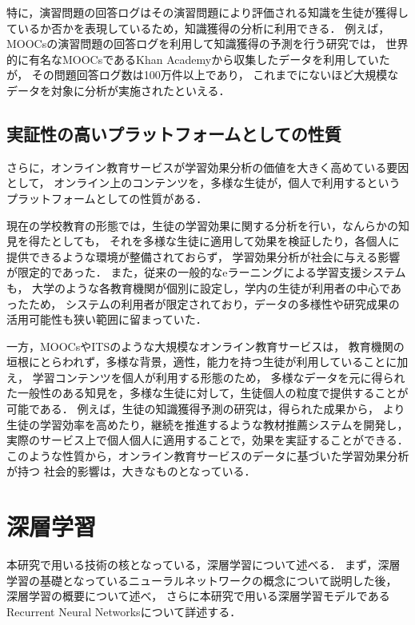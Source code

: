 特に，演習問題の回答ログはその演習問題により評価される知識を生徒が獲得しているか否かを表現しているため，知識獲得の分析に利用できる．
例えば，MOOCsの演習問題の回答ログを利用して知識獲得の予測を行う研究\cite{machardy2015toward}では，
世界的に有名なMOOCsであるKhan Academyから収集したデータを利用していたが，
その問題回答ログ数は100万件以上であり，
これまでにないほど大規模なデータを対象に分析が実施されたといえる．


\subsection{実証性の高いプラットフォームとしての性質}

さらに，オンライン教育サービスが学習効果分析の価値を大きく高めている要因として，
オンライン上のコンテンツを，多様な生徒が，個人で利用するというプラットフォームとしての性質がある．

現在の学校教育の形態では，生徒の学習効果に関する分析を行い，なんらかの知見を得たとしても，
それを多様な生徒に適用して効果を検証したり，各個人に提供できるような環境が整備されておらず，
学習効果分析が社会に与える影響が限定的であった．
また，従来の一般的なeラーニングによる学習支援システムも，
大学のような各教育機関が個別に設定し，学内の生徒が利用者の中心であったため，
システムの利用者が限定されており，データの多様性や研究成果の活用可能性も狭い範囲に留まっていた．


一方，MOOCsやITSのような大規模なオンライン教育サービスは，
教育機関の垣根にとらわれず，多様な背景，適性，能力を持つ生徒が利用していることに加え，
学習コンテンツを個人が利用する形態のため，
多様なデータを元に得られた一般性のある知見を，多様な生徒に対して，生徒個人の粒度で提供することが可能である．
例えば，生徒の知識獲得予測の研究は，得られた成果から，
より生徒の学習効率を高めたり，継続を推進するような教材推薦システムを開発し，
実際のサービス上で個人個人に適用することで，効果を実証することができる．
このような性質から，オンライン教育サービスのデータに基づいた学習効果分析が持つ
社会的影響は，大きなものとなっている．




\section{深層学習}

本研究で用いる技術の核となっている，深層学習について述べる．
まず，深層学習の基礎となっているニューラルネットワークの概念について説明した後，
深層学習の概要について述べ，
さらに本研究で用いる深層学習モデルであるRecurrent Neural Networksについて詳述する．



